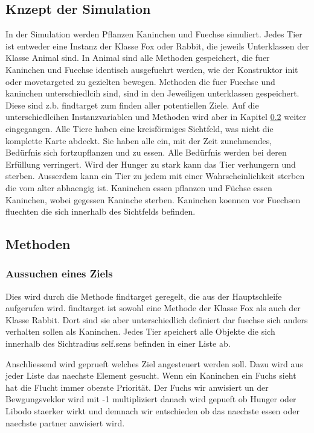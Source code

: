 \documentclass[12pt]{article}
\begin{document}
\subsection{Knzept der Simulation}
In der Simulation werden Pflanzen Kaninchen und Fuechse simuliert.
Jedes Tier ist entweder eine Instanz der Klasse Fox oder Rabbit, die jeweils Unterklassen der Klasse Animal sind.
In Animal sind alle Methoden gespeichert, die fuer Kaninchen und Fuechse identisch ausgefuehrt werden, wie der Konstruktor init oder movetargeted zu gezielten bewegen.
Methoden die fuer Fuechse und kaninchen unterschiedlcih sind, sind in den Jeweiligen unterklassen gespeichert.
Diese sind z.b. findtarget zum finden aller potentiellen Ziele.
Auf die unterschiedlcihen Instanzvariablen und Methoden wird aber in Kapitel \ref{methoden} weiter eingegangen.
Alle Tiere haben eine kreisförmiges Sichtfeld, was nicht die komplette Karte abdeckt.
Sie haben alle ein, mit der Zeit zunehmendes, Bedürfnis sich fortzupflanzen und zu essen.
Alle Bedürfnis werden bei deren Erfüllung verringert.
Wird der Hunger zu stark kann das Tier verhungern und sterben.
Ausserdem kann ein Tier zu jedem mit einer Wahrscheinlichkeit sterben die vom alter abhaengig ist.
Kaninchen essen pflanzen und Füchse essen Kaninchen, wobei gegessen Kaninche sterben.
Kaninchen koennen vor Fuechsen fluechten die sich innerhalb des Sichtfelds befinden.

\subsection{Methoden}
\label{methoden}
\subsubsection{Aussuchen eines Ziels}
Dies wird durch die Methode findtarget geregelt, die aus der Hauptschleife aufgerufen wird.
findtarget ist sowohl eine Methode der Klasse Fox als auch der Klasse Rabbit.
Dort sind sie aber unterschiedlich definiert dar fuechse sich anders verhalten sollen als Kaninchen.
Jedes Tier speichert alle Objekte die sich innerhalb des Sichtradius self.sens befinden in einer Liste ab.

Anschliessend wird geprueft welches Ziel angesteuert werden soll.
Dazu wird aus jeder Liste das naechste Element gesucht.
Wenn ein Kaninchen ein Fuchs sieht hat die Flucht immer oberste Priorität.
Der Fuchs wir anwisiert un der Bewgungsveklor wird mit -1 multipliziert
danach wird gepueft ob Hunger oder Libodo staerker wirkt und demnach wir entschieden ob das naechste essen oder naechste partner anwisiert wird.
\end{document}
